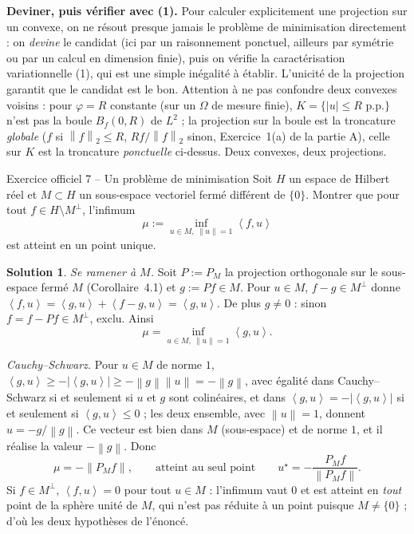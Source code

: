 \documentclass[11pt,a4paper]{article}
\newcommand{\Bf}{B_f}
\newcommand{\norm}[1]{\left\|#1\right\|}
\newcommand{\ps}[2]{\left\langle #1,#2\right\rangle}
\theoremstyle{definition}
\newtheorem*{solution}{Solution}
\begin{document}
\begin{methode}
\textbf{Deviner, puis vérifier avec (1).} Pour calculer explicitement une projection sur un convexe, on ne résout presque jamais le problème de minimisation directement : on \emph{devine} le candidat (ici par un raisonnement ponctuel, ailleurs par symétrie ou par un calcul en dimension finie), puis on vérifie la caractérisation variationnelle (1), qui est une simple inégalité à établir. L'unicité de la projection garantit que le candidat est le bon. Attention à ne pas confondre deux convexes voisins : pour $\varphi=R$ constante (sur un $\Omega$ de mesure finie), $K=\{|u|\le R\text{ p.p.}\}$ n'est pas la boule $\Bf(0,R)$ de $L^2$ ; la projection sur la boule est la troncature \emph{globale} ($f$ si $\norm f_2\le R$, $Rf/\norm f_2$ sinon, Exercice~1(a) de la partie A), celle sur $K$ est la troncature \emph{ponctuelle} ci-dessus. Deux convexes, deux projections.
\end{methode}

\begin{exo}{Exercice officiel 7 -- Un problème de minimisation}
Soit $H$ un espace de Hilbert réel et $M\subset H$ un sous-espace vectoriel fermé différent de $\{0\}$. Montrer que pour tout $f\in H\setminus M^\perp$, l'infimum
\[
\mu:=\inf_{u\in M,\ \norm u=1}\ps fu
\]
est atteint en un point unique.
\end{exo}

\begin{solution}
\emph{Se ramener à $M$.} Soit $P:=P_M$ la projection orthogonale sur le sous-espace fermé $M$ (Corollaire~4.1) et $g:=Pf\in M$. Pour $u\in M$, $f-g\in M^\perp$ donne $\ps fu=\ps gu+\ps{f-g}u=\ps gu$. De plus $g\ne0$ : sinon $f=f-Pf\in M^\perp$, exclu. Ainsi
\[
\mu=\inf_{u\in M,\ \norm u=1}\ps gu .
\]

\emph{Cauchy--Schwarz.} Pour $u\in M$ de norme $1$, $\ps gu\ge-|\ps gu|\ge-\norm g\norm u=-\norm g$, avec égalité dans Cauchy--Schwarz si et seulement si $u$ et $g$ sont colinéaires, et dans $\ps gu=-|\ps gu|$ si et seulement si $\ps gu\le0$ ; les deux ensemble, avec $\norm u=1$, donnent $u=-g/\norm g$. Ce vecteur est bien dans $M$ (sous-espace) et de norme $1$, et il réalise la valeur $-\norm g$. Donc
\[
\mu=-\norm{P_Mf},\qquad\text{atteint au seul point}\qquad u^\star=-\frac{P_Mf}{\norm{P_Mf}} .
\]
Si $f\in M^\perp$, $\ps fu=0$ pour tout $u\in M$ : l'infimum vaut $0$ et est atteint en \emph{tout} point de la sphère unité de $M$, qui n'est pas réduite à un point puisque $M\ne\{0\}$ ; d'où les deux hypothèses de l'énoncé.
\end{solution}
\end{document}
